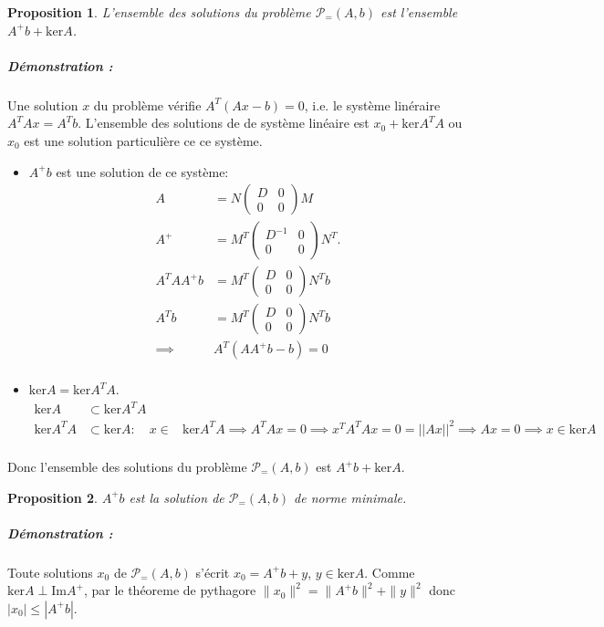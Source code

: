\documentclass[10pt,a4paper]{article}
\newtheorem{prop}{Proposition}
\begin{document}
\begin{prop}
  L'ensemble des solutions du problème $\mathcal{P}_{=}(A, b)$ est l'ensemble $A^+b + \text{ker}A$.
\end{prop}
\subparagraph{Démonstration :}
  Une solution $x$ du problème vérifie $A^T(Ax-b)=0$, i.e.
le système linéraire $A^TAx = A^Tb$.
  L'ensemble des solutions de de système linéaire est $x_0 + \text{ker}A^TA$ ou $x_0$ est une solution particulière ce ce système.
\begin{itemize}
  \item $A^+b$ est une solution de ce système:
    \begin{align*}
      A &= N \left( \begin{matrix} D & 0 \\ 0 & 0 \end{matrix}\right) M\\
      A^+ &= M^T \left( \begin{matrix} D^{-1} & 0 \\ 0 & 0 \end{matrix}\right) N^T.\\
      A^T A A^+ b &= M^T \left( \begin{matrix} D & 0 \\ 0 & 0 \end{matrix}\right) N^T b\\
      A^T b &= M^T \left( \begin{matrix} D & 0 \\ 0 & 0 \end{matrix}\right) N^T b\\
      \implies& A^T(A A^+ b - b) = 0\\
    \end{align*}
  \item $\text{ker}A = \text{ker}A^TA$.
    \begin{align*}
      \text{ker}A &\subset \text{ker}A^TA\\
      \text{ker}A^TA &\subset \text{ker}A:\quad x \in &\text{ker}A^TA \implies A^TAx = 0 \implies x^TA^TAx = 0 = || Ax ||^2 \implies Ax = 0 \implies x \in \text{ker}A\\
    \end{align*}
\end{itemize}
Donc l'ensemble des solutions du problème $\mathcal{P}_{=}(A, b)$ est $A^+b + \text{ker}A$.

\begin{prop}
  $A^+b$ est la solution de $\mathcal{P}_{=}(A, b)$ de norme minimale.
\end{prop}
\subparagraph{Démonstration :}
  Toute solutions $x_0$ de $\mathcal{P}_{=}(A, b)$ s'écrit $x_0 = A^+b + y$, $y \in \text{ker}A$.
  Comme $\text{ker}A \perp \text{Im}A^+$, par le théoreme de pythagore $\|x_0 \|^2= \|A^+b \|^2 + \| y \|^2$ donc $|x_0| \leq |A^+b|$.
\end{document}
